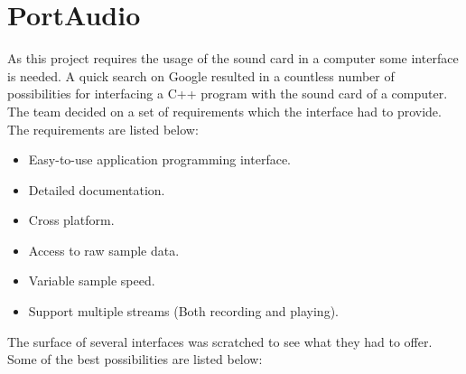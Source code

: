 \chapter{PortAudio}\label{chap:lib}\label{app:portaudio}
As this project requires the usage of the sound card in a computer some interface is needed. A quick search on Google resulted in a countless number of possibilities for interfacing a C++ program with the sound card of a computer. The team decided on a set of requirements which the interface had to provide. The requirements are listed below:

\begin{itemize}
\item Easy-to-use application programming interface.
\item Detailed documentation.
\item Cross platform.
\item Access to raw sample data.
\item Variable sample speed.
\item Support multiple streams (Both recording and playing).
\end{itemize}

The surface of several interfaces was scratched to see what they had to offer. Some of the best possibilities are listed below:

